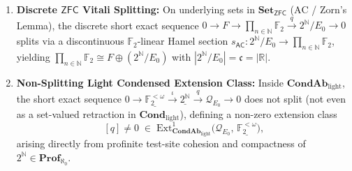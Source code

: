 \begin{theorem}
\begin{enumerate}
  \item \textbf{Discrete $\mathsf{ZFC}$ Vitali Splitting:} On underlying sets in $\mathbf{Set}_{\mathsf{ZFC}}$ ($\mathrm{AC}$ / Zorn's Lemma), the discrete short exact sequence $0 \to F \to \prod_{n \in \mathbb{N}} \mathbb{F}_2 \xrightarrow{q} 2^{\mathbb{N}}/E_0 \to 0$ splits via a discontinuous $\mathbb{F}_2$-linear Hamel section $s_{\mathsf{AC}} : 2^{\mathbb{N}}/E_0 \to \prod_{n \in \mathbb{N}} \mathbb{F}_2$, yielding $\prod_{n \in \mathbb{N}} \mathbb{F}_2 \cong F \oplus (2^{\mathbb{N}}/E_0)$ with $|2^{\mathbb{N}}/E_0| = \mathfrak{c} = |\mathbb{R}|$.
  \item \textbf{Non-Splitting Light Condensed Extension Class:} Inside $\mathbf{CondAb}_{\mathrm{light}}$, the short exact sequence $0 \to \underline{\mathbb{F}_2^{<\omega}} \xrightarrow{\iota} \underline{2^{\mathbb{N}}} \xrightarrow{q} \mathcal{Q}_{E_0} \to 0$ does not split (not even as a set-valued retraction in $\mathbf{Cond}_{\mathrm{light}}$), defining a non-zero extension class
  \[
    [q] \neq 0 \;\in\; \mathrm{Ext}^1_{\mathbf{CondAb}_{\mathrm{light}}}\!\bigl(\mathcal{Q}_{E_0},\, \underline{\mathbb{F}_2^{<\omega}}\bigr),
  \]
  arising directly from profinite test-site cohesion and compactness of $2^{\mathbb{N}} \in \mathbf{Prof}_{\aleph_0}$.
\end{enumerate}

\end{theorem}

